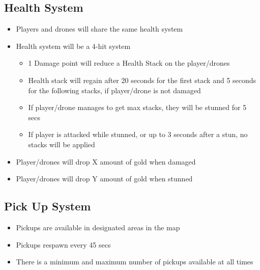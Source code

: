 \documentclass[14pt]{report}
\begin{document}
\subsection{Health System}
\begin{itemize}
    \item Players and drones will share the same health system
    \item Health system will be a 4-hit system
    \begin{itemize}
        \item 1 Damage point will reduce a Health Stack on the player/drones
        \item Health stack will regain after 20 seconds for the first stack and 5 seconds for the following stacks, if player/drone is not damaged
        \item If player/drone manages to get max stacks, they will be stunned for 5 secs
        \item If player is attacked while stunned, or up to 3 seconds after a stun, no stacks will be applied
    \end{itemize}
    \item Player/drones will drop X amount of gold when damaged
    \item Player/drones will drop Y amount of gold when stunned
\end{itemize}

\subsection{Pick Up System}
\begin{itemize}
    \item Pickups are available in designated areas in the map
    \item Pickups respawn every 45 secs
    \item There is a minimum and maximum number of pickups available at all times
\end{itemize}
\end{document}
